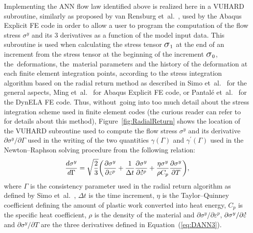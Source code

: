 \documentclass[algorithms,article,accept,pdftex,moreauthors]{Definitions/mdpi}
\DeclareRobustCommand{\Sig}{\mbox{\Large\ensuremath{\sigma}}}
\DeclareRobustCommand{\mdot}[1]{\accentset{\mbox{\bfseries .}}{#1}}
\begin{document}
Implementing the ANN flow law identified above is realized here in a VUHARD subroutine, similarly as proposed by van Rensburg et~al.~\cite{JansenVanRensburg-2012}, used by the Abaqus Explicit FE code in order to allow a user to program the computation of the flow stress $\sigma^y$ and its 3 derivatives as a function of the model input data.
This subroutine is used when calculating the stress tensor $\Sig_1$ at the end of an increment from the stress tensor at the beginning of the increment $\Sig_0$, the~deformations, the~material parameters and the history of the deformation at each finite element integration points, according to the stress integration algorithm based on the radial return method as described in Simo et~al.~\cite{Simo-1998} for the general aspects, Ming et~al.~\cite{Ming-2018} for Abaqus Explicit FE code, or Pantalé et~al.~\cite{Pantale-2004} for the DynELA FE code.
Thus, without~going into too much detail about the stress integration scheme used in finite element codes (the curious reader can refer to~\cite{Ponthot-2002, Ming-2018, Pantale-2004, Liang-2022} for details about this method), Figure~\ref{fig:RadialReturn} shows the location of the VUHARD subroutine used to compute the flow stress $\sigma^y$ and its derivative $\partial\sigma^y/\partial\Gamma$ used in the writing of the two quantities $\gamma(\Gamma)$ and $\gamma^{'}(\Gamma)$ used in the Newton--Raphson solving procedure from the following relation:
\begin{equation}
\frac{d\sigma^{y}}{d\Gamma} = \sqrt{\frac{2}{3}}\left(\frac{\partial\sigma^{y}}{\partial\varepsilon^{p}}+\frac{1}{\Delta t}\frac{\partial\sigma^{y}}{\partial\mdot{\varepsilon}^p}+\frac{\eta\sigma^{y}}{\rho C_{p}}\frac{\partial\sigma^{y}}{\partial T}\right)\label{eq:derivatives},
\end{equation}
where $\Gamma$ is the consistency parameter used in the radial return algorithm as defined by Simo et~al.~\cite{Simo-1998}, $\Delta t$ is the time increment, $\eta$ is the Taylor--Quinney coefficient defining the amount of plastic work converted into heat energy, $C_{p}$ is the specific heat coefficient, $\rho$ is the density of the material and $\partial \sigma^y/\partial\varepsilon^p$, $\partial \sigma^y/\partial\mdot\varepsilon$ and $\partial \sigma^y/\partial T$ are the three derivatives defined in Equation~(\ref{eq:DANN3}).
\end{document}
